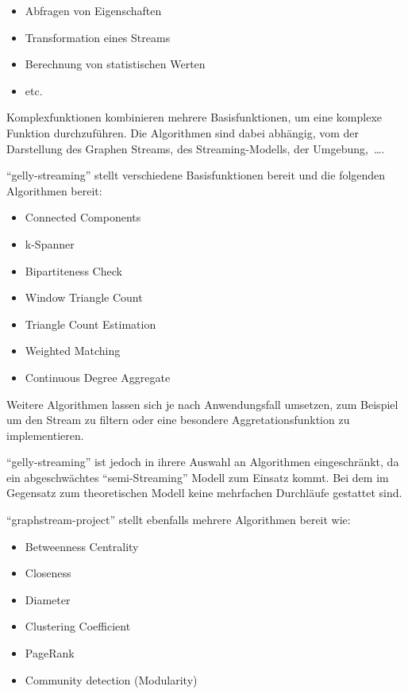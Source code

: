 \begin{itemize}
\item Abfragen von Eigenschaften
\item Transformation eines Streams
\item Berechnung von statistischen Werten
\item etc.
\end{itemize}

Komplexfunktionen kombinieren mehrere Basisfunktionen, um eine komplexe Funktion
durchzuführen. Die Algorithmen sind dabei abhängig, vom der Darstellung
des Graphen Streams, des Streaming-Modells, der Umgebung,~\dots .

\enquote{gelly-streaming} stellt verschiedene Basisfunktionen bereit und die
folgenden Algorithmen bereit: \cite{Kalavri2018}

\begin{itemize}
\item Connected Components
\item k-Spanner
\item Bipartiteness Check
\item Window Triangle Count
\item Triangle Count Estimation
\item Weighted Matching
\item Continuous Degree Aggregate
\end{itemize}

Weitere Algorithmen lassen sich je nach Anwendungsfall umsetzen, zum Beispiel um
den Stream zu filtern oder eine besondere Aggretationsfunktion zu implementieren.

\enquote{gelly-streaming} ist jedoch in ihrere Auswahl an Algorithmen eingeschränkt,
da ein abgeschwächtes \enquote{semi-Streaming} Modell zum Einsatz kommt. Bei dem
im Gegensatz zum theoretischen Modell keine mehrfachen Durchläufe gestattet sind.

\enquote{graphstream-project} stellt ebenfalls mehrere Algorithmen bereit wie:

\begin{itemize}
\item Betweenness Centrality
\item Closeness
\item Diameter
\item Clustering Coefficient
\item PageRank
\item Community detection (Modularity)
\end{itemize}

